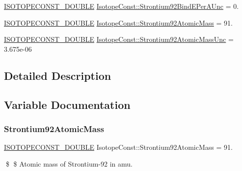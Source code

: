 \begin{DoxyCompactItemize}
\mbox{\hyperlink{group___isotope_const-_macros_ga8f45a7272ce02c0b4c65c44636ed719a}{I\+S\+O\+T\+O\+P\+E\+C\+O\+N\+S\+T\+\_\+\+D\+O\+U\+B\+LE}} \mbox{\hyperlink{group___isotope_const-_strontium-_sr92_ga8f6f90d2ca7009a0183935a088fbc555}{Isotope\+Const\+::\+Strontium92\+Bind\+E\+Per\+A\+Unc}} = 0.
\item 
\mbox{\hyperlink{group___isotope_const-_macros_ga8f45a7272ce02c0b4c65c44636ed719a}{I\+S\+O\+T\+O\+P\+E\+C\+O\+N\+S\+T\+\_\+\+D\+O\+U\+B\+LE}} \mbox{\hyperlink{group___isotope_const-_strontium-_sr92_gaa1bf1c51b0564153f48ec884bc2b002f}{Isotope\+Const\+::\+Strontium92\+Atomic\+Mass}} = 91.
\item 
\mbox{\hyperlink{group___isotope_const-_macros_ga8f45a7272ce02c0b4c65c44636ed719a}{I\+S\+O\+T\+O\+P\+E\+C\+O\+N\+S\+T\+\_\+\+D\+O\+U\+B\+LE}} \mbox{\hyperlink{group___isotope_const-_strontium-_sr92_ga33e317c32b7026da26cff4d7f6c1e386}{Isotope\+Const\+::\+Strontium92\+Atomic\+Mass\+Unc}} = 3.\+675e-\/06
\end{DoxyCompactItemize}


\subsection{Detailed Description}


\subsection{Variable Documentation}
\mbox{\label{group___isotope_const-_strontium-_sr92_gaa1bf1c51b0564153f48ec884bc2b002f}} 
\subsubsection{\texorpdfstring{Strontium92\+Atomic\+Mass}{Strontium92AtomicMass}}
{\footnotesize\ttfamily \mbox{\hyperlink{group___isotope_const-_macros_ga8f45a7272ce02c0b4c65c44636ed719a}{I\+S\+O\+T\+O\+P\+E\+C\+O\+N\+S\+T\+\_\+\+D\+O\+U\+B\+LE}} Isotope\+Const\+::\+Strontium92\+Atomic\+Mass = 91.}

\$ \$ Atomic mass of Strontium-\/92 in amu. \mbox{\label{group___isotope_const-_strontium-_sr92_ga33e317c32b7026da26cff4d7f6c1e386}} 
